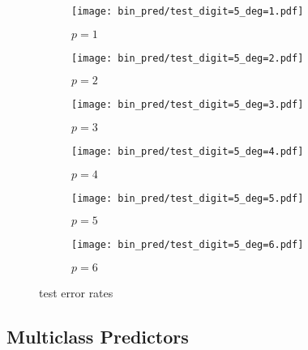\begin{figure}[h!]
    \begin{subfigure}[t]{0.49\textwidth}
        \centering
        \texttt{[image: bin\_pred/test\_digit=5\_deg=1.pdf]} 
        \caption{$p = 1$}
    \end{subfigure}
    \hfill
    \begin{subfigure}[t]{0.49\textwidth}
        \centering
        \texttt{[image: bin\_pred/test\_digit=5\_deg=2.pdf]} 
        \caption{$p = 2$}
    \end{subfigure}
    \par\bigskip
        \begin{subfigure}[t]{0.49\textwidth}
        \centering
        \texttt{[image: bin\_pred/test\_digit=5\_deg=3.pdf]} 
        \caption{$p = 3$}
    \end{subfigure}
    \hfill
    \begin{subfigure}[t]{0.49\textwidth}
        \centering
        \texttt{[image: bin\_pred/test\_digit=5\_deg=4.pdf]} 
        \caption{$p = 4$}
    \end{subfigure}
    \par\bigskip
        \begin{subfigure}[t]{0.49\textwidth}
        \centering
        \texttt{[image: bin\_pred/test\_digit=5\_deg=5.pdf]} 
        \caption{$p = 5$}
    \end{subfigure}
    \hfill
    \begin{subfigure}[t]{0.49\textwidth}
        \centering
        \texttt{[image: bin\_pred/test\_digit=5\_deg=6.pdf]} 
        \caption{$p = 6$}
    \end{subfigure}
    \caption{test error rates}
\end{figure}

\subsection{Multiclass Predictors}\label{subsec:multi_pred}

